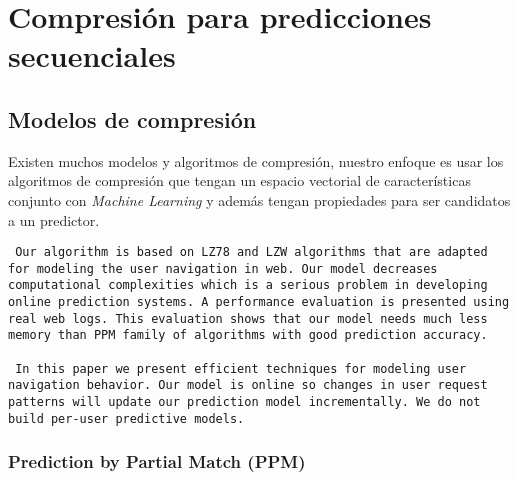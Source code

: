\uncm

\section{Compresión para predicciones secuenciales}




\vspace{1cm}
\subsection{Modelos de compresión}


Existen muchos modelos y algoritmos de compresión, nuestro enfoque es usar los algoritmos de compresión que tengan un espacio vectorial de características conjunto con \emph{Machine Learning} y además tengan propiedades para ser candidatos a un predictor. 


\begin{verbatim}
 Our algorithm is based on LZ78 and LZW algorithms that are adapted for modeling the user navigation in web. Our model decreases computational complexities which is a serious problem in developing online prediction systems. A performance evaluation is presented using real web logs. This evaluation shows that our model needs much less memory than PPM family of algorithms with good prediction accuracy.
 
 In this paper we present efficient techniques for modeling user navigation behavior. Our model is online so changes in user request patterns will update our prediction model incrementally. We do not build per-user predictive models. 
\end{verbatim}
\LDCMoghaddam


 
\subsubsection{Prediction by Partial Match (PPM)}
 
